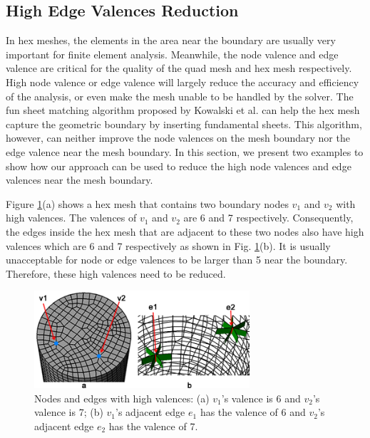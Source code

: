 \documentclass[final,5p,times,twocolumn]{elsarticle}
\begin{document}
\subsection{High Edge Valences Reduction}
\label{sec:red_edge_val}
In hex meshes, the elements in the area near the boundary are usually very important for finite element analysis\cite{Kowalski2011}. Meanwhile, the node valence and edge valence are critical for the quality of the quad mesh and hex mesh respectively\cite{Owen1998, Staten2010d,Tarini2010}. High node valence or edge valence will largely reduce the accuracy and efficiency of the analysis, or even make the mesh unable to be handled by the solver. The fun sheet matching algorithm proposed by Kowalski et al. \cite{Kowalski2011} can help the hex mesh capture the geometric boundary by inserting fundamental sheets. This algorithm, however, can neither improve the node valences on the mesh boundary nor the edge valence near the mesh boundary. In this section, we present two examples to show how our approach can be used to reduce the high node valences and edge valences near the mesh boundary.

Figure \ref{fig:exam2_input}(a) shows a hex mesh that contains two boundary nodes $v_1$ and $v_2$ with high valences. The valences of $v_1$ and $v_2$ are 6 and 7 respectively. Consequently, the edges inside the hex mesh that are adjacent to these two nodes also have high valences which are 6 and 7 respectively as shown in Fig. \ref{fig:exam2_input}(b). It is usually unacceptable for node or edge valences to be larger than 5 near the boundary. Therefore, these high valences need to be reduced.

\begin{figure}[htbp]
\begin{center}
\includegraphics[width=8cm]{figures/exam2_input.png}
\caption{Nodes and edges with high valences: (a) $v_1$'s valence is 6 and $v_2$'s valence is 7; (b) $v_1$'s adjacent edge $e_1$ has the valence of 6 and $v_2$'s adjacent edge $e_2$ has the valence of 7.}
\label{fig:exam2_input}
\end{center}
\end{figure}
\end{document}
